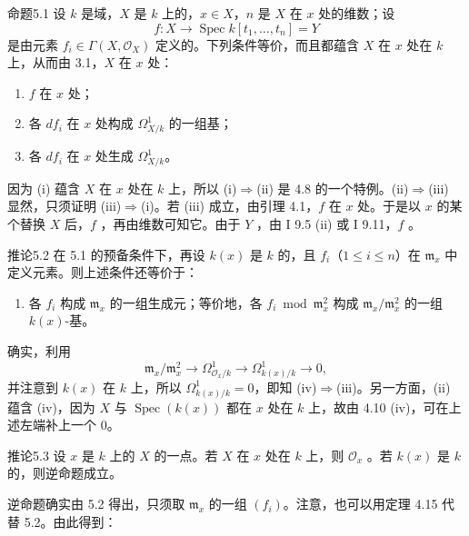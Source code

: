 \begin{SGAresult}{命题}{5.1}
设 $k$ 是域，$X$ 是 $k$ 上的，$x\in X$，$n$ 是 $X$ 在 $x$ 处的维数；设
\[
f:X\longrightarrow\operatorname{Spec}k[t_1,\ldots,t_n]=Y
\]
是由元素 $f_i\in\Gamma(X,\mathcal O_X)$ 定义的。下列条件等价，而且都蕴含 $X$ 在 $x$ 处在 $k$ 上，从而由 3.1，$X$ 在 $x$ 处：
\begin{enumerate}
\item[(i)] $f$ 在 $x$ 处；
\item[(ii)] 各 $df_i$ 在 $x$ 处构成 $\Omega^1_{X/k}$ 的一组基；
\item[(iii)] 各 $df_i$ 在 $x$ 处生成 $\Omega^1_{X/k}$。
\end{enumerate}
\end{SGAresult}
因为 (i) 蕴含 $X$ 在 $x$ 处在 $k$ 上，所以 (i)$\Rightarrow$(ii) 是 4.8 的一个特例。(ii)$\Rightarrow$(iii) 显然，只须证明 (iii)$\Rightarrow$(i)。若 (iii) 成立，由引理 4.1，$f$ 在 $x$ 处。于是以 $x$ 的某个替换 $X$ 后，$f$ ，再由维数可知它。由于 $Y$ ，由 I 9.5 (ii) 或 I 9.11，$f$ 。

\begin{SGAresult}{推论}{5.2}
在 5.1 的预备条件下，再设 $k(x)$ 是 $k$ 的，且 $f_i$（$1\leq i\leq n$）在 $\mathfrak m_x$ 中定义元素。则上述条件还等价于：
\begin{enumerate}
\item[(iv)] 各 $f_i$ 构成 $\mathfrak m_x$ 的一组生成元；等价地，各 $f_i\bmod\mathfrak m_x^2$ 构成 $\mathfrak m_x/\mathfrak m_x^2$ 的一组 $k(x)$-基。
\end{enumerate}
\end{SGAresult}
确实，利用
\[
\mathfrak m_x/\mathfrak m_x^2\longrightarrow\Omega^1_{\mathcal O_x/k}
\longrightarrow\Omega^1_{k(x)/k}\longrightarrow0,\tag{5.1}
\]
并注意到 $k(x)$ 在 $k$ 上，所以 $\Omega^1_{k(x)/k}=0$，即知 (iv)$\Rightarrow$(iii)。另一方面，(ii) 蕴含 (iv)，因为 $X$ 与 $\operatorname{Spec}(k(x))$ 都在 $x$ 处在 $k$ 上，故由 4.10 (iv)，可在上述左端补上一个 $0$。

\begin{SGAresult}{推论}{5.3}
设 $x$ 是 $k$ 上的 $X$ 的一点。若 $X$ 在 $x$ 处在 $k$ 上，则 $\mathcal O_x$ 。若 $k(x)$ 是 $k$ 的，则逆命题成立。
\end{SGAresult}
逆命题确实由 5.2 得出，只须取 $\mathfrak m_x$ 的一组 $(f_i)$。注意，也可以用定理 4.15 代替 5.2。由此得到：

